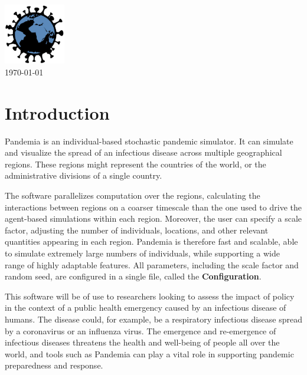 \documentclass[10pt,letterpaper]{article}
\begin{document}


\vspace*{0.2in}

\begin{centering}
{\Huge\textbf{}}
\\
\bigskip
\includegraphics[width=0.2\textwidth]{pandemia_logo}
\\
\bigskip
\today
\\
\end{centering}

\tableofcontents

\section{Introduction}

Pandemia is an individual-based stochastic pandemic simulator. It can simulate and visualize the spread of an infectious disease across multiple geographical regions. These regions might represent the countries of the world, or the administrative divisions of a single country.

The software parallelizes computation over the regions, calculating the interactions between regions on a coarser timescale than the one used to drive the agent-based simulations within each region. Moreover, the user can specify a scale factor, adjusting the number of individuals, locations, and other relevant quantities appearing in each region. Pandemia is therefore fast and scalable, able to simulate extremely large numbers of individuals, while supporting a wide range of highly adaptable features. All parameters, including the scale factor and random seed, are configured in a single file, called the \textbf{Configuration}.

This software will be of use to researchers looking to assess the impact of policy in the context of a public health emergency caused by an infectious disease of humans. The disease could, for example, be a respiratory infectious disease spread by a coronavirus or an influenza virus. The emergence and re-emergence of infectious diseases threatens the health and well-being of people all over the world, and tools such as Pandemia can play a vital role in supporting pandemic preparedness and response.
\end{document}
